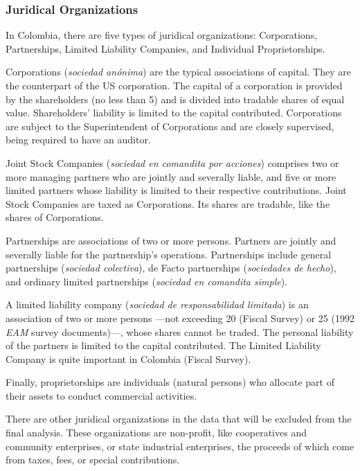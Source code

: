 \documentclass[
  12pt]{article}
\theoremstyle{definition}
\theoremstyle{remark}
\begin{document}
\subsubsection{Juridical Organizations}\label{juridical-organizations}

In Colombia, there are five types of juridical organizations:
Corporations, Partnerships, Limited Liability Companies, and Individual
Proprietorships.

Corporations (\emph{sociedad anónima}) are the typical associations of
capital. They are the counterpart of the US corporation. The capital of
a corporation is provided by the shareholders (no less than 5) and is
divided into tradable shares of equal value. Shareholders' liability is
limited to the capital contributed. Corporations are subject to the
Superintendent of Corporations and are closely supervised, being
required to have an auditor.

Joint Stock Companies (\emph{sociedad en comandita por acciones})
comprises two or more managing partners who are jointly and severally
liable, and five or more limited partners whose liability is limited to
their respective contributions. Joint Stock Companies are taxed as
Corporations. Its shares are tradable, like the shares of Corporations.

Partnerships are associations of two or more persons. Partners are
jointly and severally liable for the partnership's operations.
Partnerships include general partnerships (\emph{sociedad colectiva}),
de Facto partnerships (\emph{sociedades de hecho}), and ordinary limited
partnerships (\emph{sociedad en comandita simple}).

A limited liability company (\emph{sociedad de responsabilidad
limitada}) is an association of two or more persons ---not exceeding 20
(Fiscal Survey) or 25 (1992 \emph{EAM} survey documents)---, whose
shares cannot be traded. The personal liability of the partners is
limited to the capital contributed. The Limited Liability Company is
quite important in Colombia (Fiscal Survey).

Finally, proprietorships are individuals (natural persons) who allocate
part of their assets to conduct commercial activities.

There are other juridical organizations in the data that will be
excluded from the final analysis. These organizations are non-profit,
like cooperatives and community enterprises, or state industrial
enterprises, the proceeds of which come from taxes, fees, or special
contributions.
\end{document}
